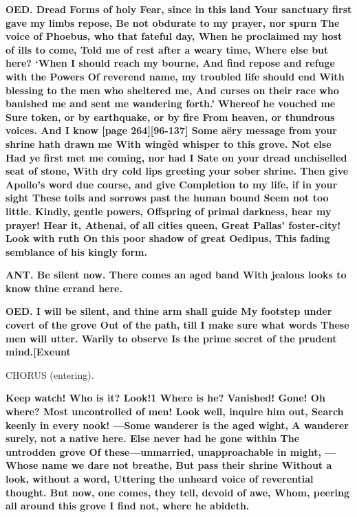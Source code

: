 \documentclass[11pt,letter]{book}
\begin{document}
\par \textbf{OED. Dread Forms of holy Fear, since in this land Your sanctuary first gave my limbs repose, Be not obdurate to my prayer, nor spurn The voice of Phoebus, who that fateful day, When he proclaimed my host of ills to come, Told me of rest after a weary time, Where else but here? ‘When I should reach my bourne, And find repose and refuge with the Powers Of reverend name, my troubled life should end With blessing to the men who sheltered me, And curses on their race who banished me and sent me wandering forth.’ Whereof he vouched me Sure token, or by earthquake, or by fire From heaven, or thundrous voices. And I know [page 264][96-137] Some aëry message from your shrine hath drawn me With wingèd whisper to this grove. Not else Had ye first met me coming, nor had I Sate on your dread unchiselled seat of stone, With dry cold lips greeting your sober shrine. Then give Apollo’s word due course, and give Completion to my life, if in your sight These toils and sorrows past the human bound Seem not too little. Kindly, gentle powers, Offspring of primal darkness, hear my prayer! Hear it, Athenai, of all cities queen, Great Pallas’ foster-city! Look with ruth On this poor shadow of great Oedipus, This fading semblance of his kingly form.}
\par 

\par \textbf{ANT. Be silent now. There comes an aged band With jealous looks to know thine errand here.}
\par 

\par \textbf{OED. I will be silent, and thine arm shall guide My footstep under covert of the grove Out of the path, till I make sure what words These men will utter. Warily to observe Is the prime secret of the prudent mind.[Exeunt}
\par 

\par  CHORUS (entering).

\par \textbf{Keep watch! Who is it? Look!1 Where is he? Vanished! Gone! Oh where? Most uncontrolled of men! Look well, inquire him out, Search keenly in every nook! —Some wanderer is the aged wight, A wanderer surely, not a native here. Else never had he gone within The untrodden grove Of these—unmarried, unapproachable in might, —Whose name we dare not breathe, But pass their shrine Without a look, without a word, Uttering the unheard voice of reverential thought. But now, one comes, they tell, devoid of awe, Whom, peering all around this grove I find not, where he abideth.}
\par 
\end{document}
